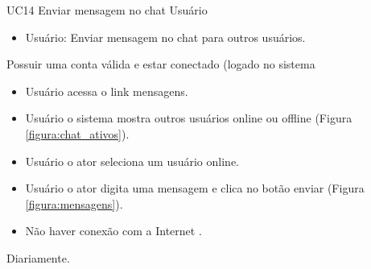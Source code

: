 
\casoDeUso
{UC14}
{Enviar mensagem no chat}
{Usuário}
{
\begin{itemize}
	\item Usuário: Enviar mensagem no chat para outros usuários.
	
\end{itemize}

}
 {Possuir uma conta válida e estar conectado (logado no sistema}
{}
{
\begin{itemize}
	\item Usuário acessa o link mensagens.
	\item Usuário o sistema mostra outros usuários online ou offline (Figura \ref{figura:chat_ativos}).
	\item Usuário o ator seleciona um usuário online.
	\item Usuário o ator digita uma mensagem e clica no botão enviar (Figura \ref{figura:mensagens}).
\end{itemize}
}
{
\begin{itemize}
	\item Não haver conexão com a Internet .

\end{itemize}
}
{Diariamente.}
{

}
